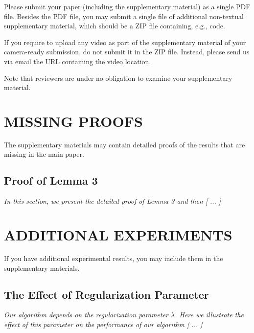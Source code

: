 Please submit your paper (including the supplementary material) as a single PDF file. Besides the PDF file, you may submit a single file of additional non-textual supplementary material, which should be a ZIP file containing, e.g., code.

If you require to upload any video as part of the supplementary material of your camera-ready submission, do not submit it in the ZIP file. Instead, please send us via email the URL containing the video location.

Note that reviewers are under no obligation to examine your supplementary material.

\section{MISSING PROOFS}

The supplementary materials may contain detailed proofs of the results that are missing in the main paper.

\subsection{Proof of Lemma 3}

\textit{In this section, we present the detailed proof of Lemma 3 and then [ ... ]}

\section{ADDITIONAL EXPERIMENTS}

If you have additional experimental results, you may include them in the supplementary materials.

\subsection{The Effect of Regularization Parameter}

\textit{Our algorithm depends on the regularization parameter $\lambda$. Here we illustrate the effect of this parameter on the performance of our algorithm [ ... ]}


